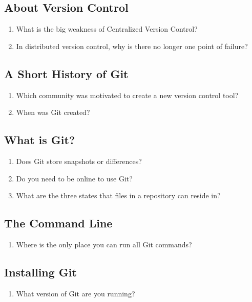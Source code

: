 \subsection{About Version Control}
\begin{enumerate}
	\item What is the big weakness of Centralized Version Control?
	\item In distributed version control, why is there no longer one point
	    of failure?
\end{enumerate}

\subsection{A Short History of Git}
\begin{enumerate}
	\item Which community was motivated to create a new version control tool?
	\item When was Git created?
\end{enumerate}

\subsection{What is Git?}
\begin{enumerate}
	\item Does Git store snapshots or differences?
	\item Do you need to be online to use Git?
	\item What are the three states that files in a repository can reside
	    in?
\end{enumerate}

\subsection{The Command Line}

\begin{enumerate}
	\item Where is the only place you can run all Git commands?
\end{enumerate}


\subsection{Installing Git}

\begin{enumerate}
	\item What version of Git are you running?
\end{enumerate}

